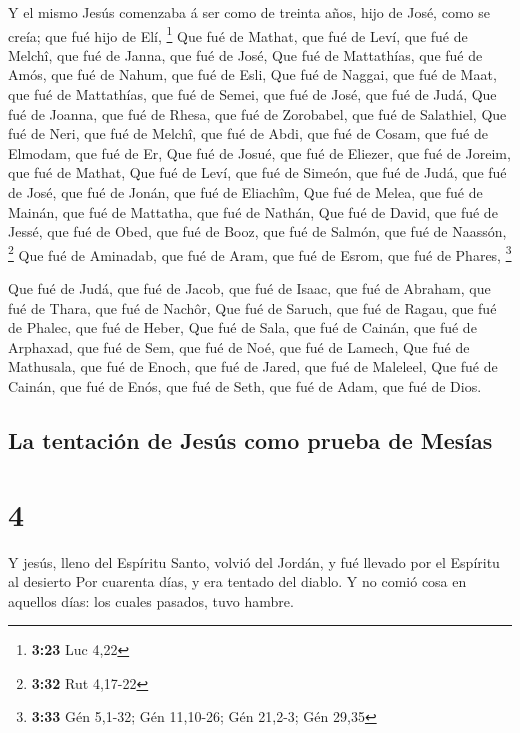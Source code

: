  Y el mismo Jesús comenzaba á ser como de treinta años,
hijo de José, como se creía; que fué hijo de Elí, \footnote{\textbf{3:23}
  Luc 4,22}  Que fué de Mathat, que fué de Leví, que fué de
Melchî, que fué de Janna, que fué de José,  Que fué de
Mattathías, que fué de Amós, que fué de Nahum, que fué de Esli,
 Que fué de Naggai, que fué de Maat, que fué de Mattathías,
que fué de Semei, que fué de José, que fué de Judá,  Que
fué de Joanna, que fué de Rhesa, que fué de Zorobabel, que fué de
Salathiel,  Que fué de Neri, que fué de Melchî, que fué de
Abdi, que fué de Cosam, que fué de Elmodam, que fué de Er, 
Que fué de Josué, que fué de Eliezer, que fué de Joreim, que fué de
Mathat,  Que fué de Leví, que fué de Simeón, que fué de
Judá, que fué de José, que fué de Jonán, que fué de Eliachîm,
 Que fué de Melea, que fué de Mainán, que fué de Mattatha,
que fué de Nathán,  Que fué de David, que fué de Jessé, que
fué de Obed, que fué de Booz, que fué de Salmón, que fué de Naassón,
\footnote{\textbf{3:32} Rut 4,17-22}  Que fué de Aminadab,
que fué de Aram, que fué de Esrom, que fué de Phares, \footnote{\textbf{3:33}
  Gén 5,1-32; Gén 11,10-26; Gén 21,2-3; Gén 29,35}

 Que fué de Judá, que fué de Jacob, que fué de Isaac, que
fué de Abraham, que fué de Thara, que fué de Nachôr,  Que
fué de Saruch, que fué de Ragau, que fué de Phalec, que fué de Heber,
 Que fué de Sala, que fué de Cainán, que fué de Arphaxad,
que fué de Sem, que fué de Noé, que fué de Lamech,  Que fué
de Mathusala, que fué de Enoch, que fué de Jared, que fué de Maleleel,
 Que fué de Cainán, que fué de Enós, que fué de Seth, que
fué de Adam, que fué de Dios.

\hypertarget{la-tentaciuxf3n-de-jesuxfas-como-prueba-de-mesuxedas}{%
\subsection{La tentación de Jesús como prueba de
Mesías}\label{la-tentaciuxf3n-de-jesuxfas-como-prueba-de-mesuxedas}}

\hypertarget{section-3}{%
\section{4}\label{section-3}}

 Y jesús, lleno del Espíritu Santo, volvió del Jordán, y fué
llevado por el Espíritu al desierto  Por cuarenta días, y
era tentado del diablo. Y no comió cosa en aquellos días: los cuales
pasados, tuvo hambre.

